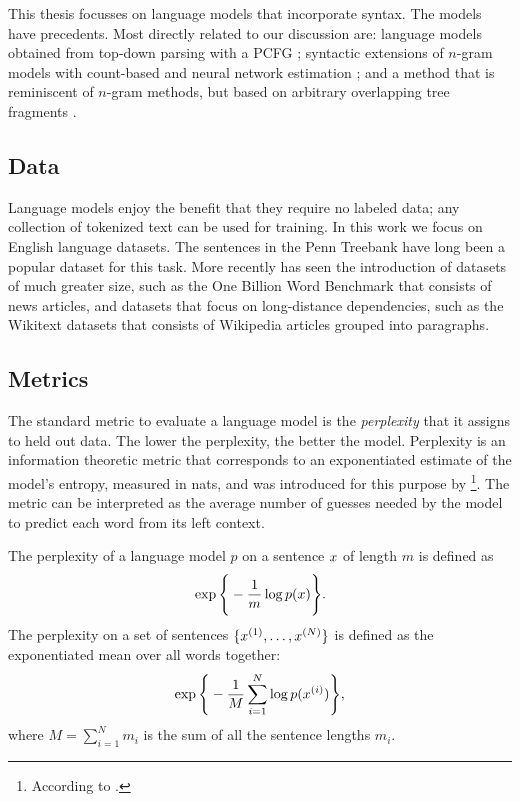     This thesis focusses on language models that incorporate syntax. The models have precedents. Most directly related to our discussion are: language models obtained from top-down parsing with a PCFG \citep{roark2001probabilistic}; syntactic extensions of $n$-gram models with count-based and neural network estimation \citep{chelba2000structured,emami2005neural}; and a method that is reminiscent of $n$-gram methods, but based on arbitrary overlapping tree fragments \citep{pauls2012treelets}.

  \subsection{Data}
    Language models enjoy the benefit that they require no labeled data; any collection of tokenized text can be used for training. In this work we focus on English language datasets. The sentences in the Penn Treebank have long been a popular dataset for this task. More recently has seen the introduction of datasets of much greater size, such as the One Billion Word Benchmark \citep{chelba2013one} that consists of news articles, and datasets that focus on long-distance dependencies, such as the Wikitext datasets \citep{merity2016pointer} that consists of Wikipedia articles grouped into paragraphs.

  \subsection{Metrics}
    The standard metric to evaluate a language model is the \textit{perplexity} that it assigns to held out data. The lower the perplexity, the better the model. Perplexity is an information theoretic metric that corresponds to an exponentiated estimate of the model's entropy, measured in nats, and was introduced for this purpose by \citet{jelinek1997information}\footnote{According to \citep{chelba2017n}.}. The metric can be interpreted as the average number of guesses needed by the model to predict each word from its left context.

    \begin{definition}{} The perplexity of a language model $p$ on a sentence $x$ of length $m$ is defined as
    \begin{align*}
      \exp \Bigg\{ - \frac{1}{m} \log p( x ) \Bigg\}.
    \end{align*}
    The perplexity on a set of sentences $\{ x^{(1)}, \dots, x^{(N)} \}$ is defined as the exponentiated mean over all words together:
    \begin{align*}
      \exp \Bigg\{ - \frac{1}{M} \sum_{i=1}^N \log p( x^{(i)} ) \Bigg\},
    \end{align*}
    where $M = \sum_{i=1}^N m_i$ is the sum of all the sentence lengths $m_i$.
    \end{definition}

